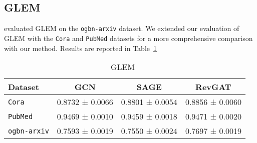 \documentclass{article}
\begin{document}
\subsection{GLEM}
\citet{zhao2022learning_em} evaluated GLEM on the \texttt{ogbn-arxiv} dataset. We extended our evaluation of GLEM with the \texttt{Cora} and \texttt{PubMed} datasets for a more comprehensive comparison with our method. Results are reported in Table~\ref{rebuttal tab: glem}
\begin{table}[!ht]
      \centering
        \caption{GLEM~\citep{zhao2022learning_em}}
    \label{rebuttal tab: glem}
    \centering
    \small
    \begin{tabular}{lccc}
    \toprule
         Dataset &  GCN & SAGE & RevGAT\\
         \midrule
        {\texttt{Cora}} 
        & {0.8732 ± 0.0066} 
        & {0.8801 ± 0.0054} 
        & {0.8856 ± 0.0060}\\
        {\texttt{PubMed}} & 
        {0.9469 ± 0.0010}
        & {0.9459 ± 0.0018}
        & {0.9471 ± 0.0020}\\
        \texttt{ogbn-arxiv} & 0.7593 ± 0.0019 & 0.7550 ± 0.0024 & 0.7697 ± 0.0019\\
        \bottomrule
    \end{tabular}
\end{table}
\end{document}
